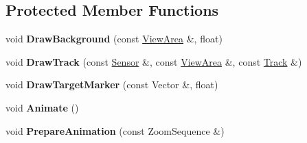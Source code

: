 \subsection*{Protected Member Functions}
\begin{DoxyCompactItemize}
\item 
void {\bfseries Draw\+Background} (const \hyperlink{structRadar_1_1ViewArea}{View\+Area} \&, float)\hypertarget{classRadar_1_1BubbleDisplay_ad306e7a8b7716747a42f06508c650201}{}\label{classRadar_1_1BubbleDisplay_ad306e7a8b7716747a42f06508c650201}

\item 
void {\bfseries Draw\+Track} (const \hyperlink{classRadar_1_1Sensor}{Sensor} \&, const \hyperlink{structRadar_1_1ViewArea}{View\+Area} \&, const \hyperlink{classRadar_1_1Track}{Track} \&)\hypertarget{classRadar_1_1BubbleDisplay_adb063c63cc42ff14fc8529e853974fe9}{}\label{classRadar_1_1BubbleDisplay_adb063c63cc42ff14fc8529e853974fe9}

\item 
void {\bfseries Draw\+Target\+Marker} (const Vector \&, float)\hypertarget{classRadar_1_1BubbleDisplay_a1c2483aa32f216eb6e9670700fe97ae7}{}\label{classRadar_1_1BubbleDisplay_a1c2483aa32f216eb6e9670700fe97ae7}

\item 
void {\bfseries Animate} ()\hypertarget{classRadar_1_1BubbleDisplay_a9c307304b000ecf9dfe2bcc429a6dc11}{}\label{classRadar_1_1BubbleDisplay_a9c307304b000ecf9dfe2bcc429a6dc11}

\item 
void {\bfseries Prepare\+Animation} (const Zoom\+Sequence \&)\hypertarget{classRadar_1_1BubbleDisplay_a9e02326b9a2e090fe5929612897b066c}{}\label{classRadar_1_1BubbleDisplay_a9e02326b9a2e090fe5929612897b066c}

\end{DoxyCompactItemize}
